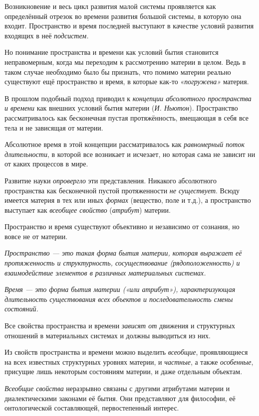 \documentclass[a4paper,14pt,russian]{extreport}
\begin{document}
Возникновение и весь цикл развития малой системы проявляется как определённый отрезок во времени развития большой системы, в которую она входит. Пространство и время последней выступают в качестве условий развития входящих в неё \emph{подсистем.}

Но понимание пространства и времени как условий бытия становится неправомерным, когда мы переходим к рассмотрению материи в целом. Ведь в таком случае необходимо было бы признать, что помимо материи реально существуют ещё пространство и время, в которые как-то «\emph{погружена»} материя.

В прошлом подобный подход приводил к \emph{концепции абсолютного пространства и времени} как внешних условий бытия материи (\emph{И. Ньютон}). Пространство рассматривалось как бесконечная пустая протяжённость, вмещающая в себя все тела и не зависящая от материи.

Абсолютное время в этой концепции рассматривалось как \emph{равномерный поток длительности}, в которой все возникает и исчезает, но которая сама не зависит ни от каких процессов в мире.

Развитие науки \emph{опровергло} эти представления. Никакого абсолютного пространства как бесконечной пустой протяженности \emph{не существует}. Всюду имеется материя в тех или иных \emph{формах} (вещество, поле и т.д.), а пространство выступает как \emph{всеобщее свойство} (\emph{атрибут}) материи.

Пространство и время существуют объективно и независимо от сознания, но вовсе не от материи.

\emph{Пространство --- это такая форма бытия материи, которая выражает её протяженность и структурность, сосуществование (рядоположенность) и взаимодействие элементов в различных материальных системах.}

\emph{Время --- это форма бытия материи («или атрибут»), характеризующая длительность существования всех объектов и последовательность смены состояний.}

Все свойства пространства и времени \emph{зависят от} движения и структурных отношений в материальных системах и должны выводиться из них.

Из свойств пространства и времени можно выделить \emph{всеобщие}, проявляющиеся на всех известных структурных уровнях материи, и \emph{частные}, а также \emph{особенные}, присущие лишь некоторым состояниям материи, и даже отдельным объектам.

\emph{Всеобщие свойства} неразрывно связаны с другими атрибутами материи и диалектическими законами её бытия. Они представляют для философии, её онтологической составляющей, первостепенный интерес.
\end{document}
